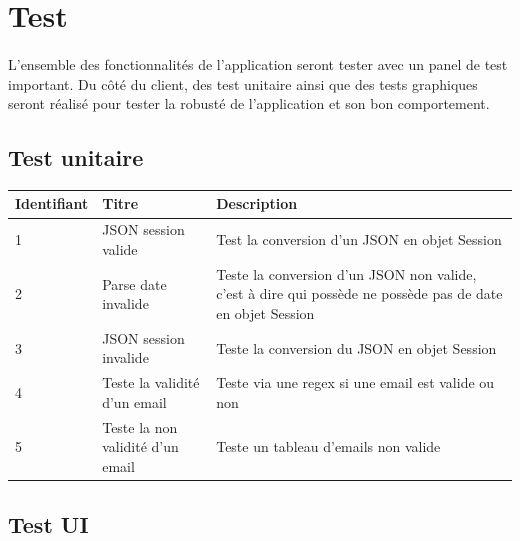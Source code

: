 \documentclass[titlepage, 12pt]{report}
\begin{document}

\section{Test}

\paragraph{}L'ensemble des fonctionnalités de l'application seront tester avec un panel de test important. Du côté du client, des test unitaire ainsi que des tests graphiques seront réalisé pour tester la robusté de l'application et son bon comportement.

\subsection{Test unitaire}

\begin{tabularx}{\textwidth}{|X|X|X|}
	\hline
	Identifiant & Titre & Description \\
	\hline
	1 & JSON session valide & Test la conversion d'un JSON en objet Session \\
	\hline
	2 & Parse date invalide & Teste la conversion d'un JSON non valide, c'est à dire qui possède ne possède pas de date en objet Session \\
	\hline
	3 & JSON session invalide & Teste la conversion du JSON en objet Session \\
	\hline
	4 & Teste la validité d'un email & Teste via une regex si une email est valide ou non \\
	\hline
	5 & Teste la non validité d'un email & Teste un tableau d'emails non valide \\
	\hline \hline
\end{tabularx}

\newpage

\subsection{Test UI}
\end{document}
